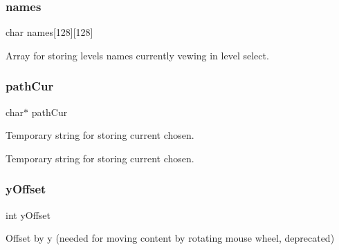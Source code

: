 \mbox{\label{group___core_ga6341080327d9c3d3ef08fdccd4f05262}} 
\subsubsection{\texorpdfstring{names}{names}}
{\footnotesize\ttfamily char names\mbox{[}128\mbox{]}\mbox{[}128\mbox{]}}



Array for storing levels names currently vewing in level select. 

\mbox{\label{group___core_ga39642f859bbe17ccc6e6d98f84a7cdea}} 
\subsubsection{\texorpdfstring{path\+Cur}{pathCur}}
{\footnotesize\ttfamily char$\ast$ path\+Cur}



Temporary string for storing current chosen. 

Temporary string for storing current chosen. \mbox{\label{group___core_ga016718268d32fcb95b1190cc1071e270}} 
\subsubsection{\texorpdfstring{y\+Offset}{yOffset}}
{\footnotesize\ttfamily int y\+Offset}

Offset by y (needed for moving content by rotating mouse wheel, deprecated) 